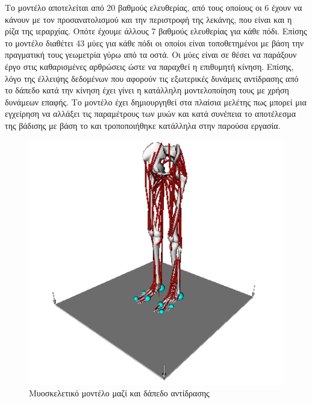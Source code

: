 Το μοντέλο αποτελείται από 20 βαθμούς ελευθερίας, από τους οποίους οι 6 έχουν να κάνουν με τον προσανατολισμού και την περιστροφή της λεκάνης, που είναι και η ρίζα της ιεραρχίας. Οπότε έχουμε άλλους 7 βαθμούς ελευθερίας για κάθε πόδι. Επίσης το μοντέλο διαθέτει 43 μύες για κάθε πόδι οι οποίοι είναι τοποθετημένοι με βάση την πραγματική τους γεωμετρία γύρω από τα οστά. Οι μύες είναι σε θέσει να παράξουν έργο στις καθαρισμένες αρθρώσεις ώστε να παραχθεί η επιθυμητή κίνηση. Επίσης, λόγο της έλλειψης δεδομένων που αφορούν τις εξωτερικές δυνάμεις αντίδρασης από το δάπεδο κατά την κίνηση έχει γίνει η κατάλληλη μοντελοποίηση τους με χρήση δυνάμεων επαφής. Το μοντέλο έχει δημιουργηθεί στα πλαίσια μελέτης πως μπορεί μια εγχείρηση να αλλάξει τις παραμέτρους των μυών και κατά συνέπεια το αποτέλεσμα της βάδισης με βάση το \cite{delp90} και τροποποιήθηκε κατάλληλα στην παρούσα εργασία.

\begin{figure}[H]
    \centering
    \includegraphics[height=0.38\textheight]{methods/fig/lower-limb-model.png}
    \caption{Μυοσκελετικό μοντέλο μαζί και δάπεδο αντίδρασης}
    \label{fig:lower-limb-model}
\end{figure}

